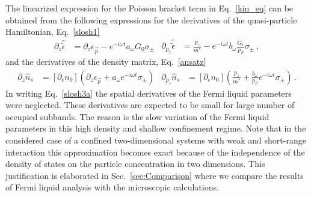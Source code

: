 The linearized expression for the Poisson bracket term in Eq.~\eqref{kin_eq} can be obtained from the following expressions for the derivatives of the quasi-particle Hamiltonian, Eq.~\eqref{slosh1}
\begin{subequations}\label{slosh3}
\begin{align}\label{slosh3a}
\partial_z \hat{\tilde{\epsilon}} & = \partial_z \epsilon_{\vec{p}} - e^{-i \omega t } a_{\omega} G_0 \sigma_{\pm}
\end{align}
\begin{align}\label{slosh3b}
\partial_{p_z} \hat{\tilde{\epsilon}} & = \frac{p_z}{m^*} - e^{-i \omega t } b_{\omega}  \frac{G_1}{p_F} \sigma_{\pm}\, ,
\end{align}
\end{subequations}
and the derivatives of the density matrix, Eq.~\eqref{ansatz}
\begin{subequations}\label{slosh4}
\begin{align}\label{slosh4a}
\partial_z \hat{n}_s & = [\partial_{\epsilon} n_0]
\left( \partial_z \epsilon_{\vec{p}} + a_{\omega} e^{-i \omega t} \sigma_{\pm} \right)
\end{align}
\begin{align}\label{slosh4b}
\partial_{p_z} \hat{n}_s & = [\partial_{\epsilon} n_0]
\left( \frac{p_z}{m^*} + \frac{b_{\omega}}{p_F} e^{ - i \omega t} \sigma_{\pm} \right)\, .
\end{align}
\end{subequations}
In writing Eq.~\eqref{slosh3a} the spatial derivatives of the Fermi liquid parameters were neglected.
These derivatives are expected to be small for large number of occupied subbands.
The reason is the slow variation of the Fermi liquid parameters in this high density and shallow confinement regime.
Note that in the considered case of a confined two-dimensional systems with weak and short-range interaction this approximation becomes exact because of the independence of the density of states on the particle concentration in two dimensions.
This justification is elaborated in Sec.~\ref{sec:Comparison} where we compare the results of Fermi liquid analysis with the microscopic calculations.

